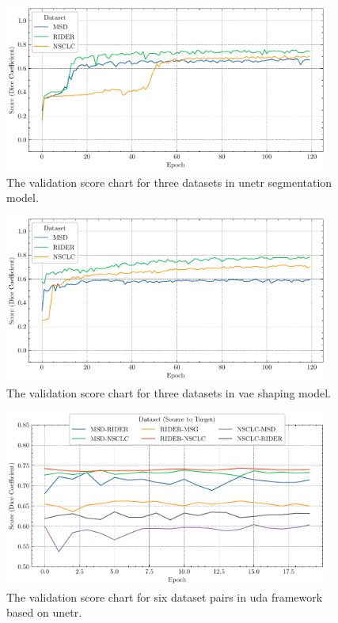 \documentclass[11pt,times,oneside,openright]{eeereport}
\begin{document}
\begin{figure}[h]
    \centering
    \includegraphics[width=0.95\textwidth]{fig/result/unetr_val.pdf}
    \caption{The validation score chart for three datasets in \acrshort{unetr} segmentation model.}
    \label{fig:unetr_val}
\end{figure}

\begin{figure}[h]
    \centering
    \includegraphics[width=0.95\textwidth]{fig/result/vae_val.pdf}
    \caption{The validation score chart for three datasets in \acrshort{vae} shaping model.}
    \label{fig:vae_val}
\end{figure}

\begin{figure}[h]
    \centering
    \includegraphics[width=0.95\textwidth]{fig/result/unetr_uda_val.pdf}
    \caption{The validation score chart for six dataset pairs in \acrshort{uda} framework based on \acrshort{unetr}.}
    \label{fig:unetr_uda_val}
\end{figure}
\end{document}
